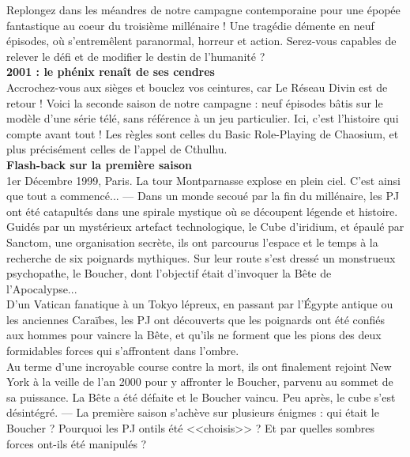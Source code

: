 \documentclass[11pt,twoside,a4paper]{book}
\begin{document}
Replongez dans les m{\'e}andres de notre campagne contemporaine pour une {\'e}pop{\'e}e fantastique au coeur du troisi{\`e}me mill{\'e}naire ! Une trag{\'e}die d{\'e}mente en neuf {\'e}pisodes, o{\`u} s'entrem{\^e}lent paranormal, horreur et action. Serez-vous capables de relever le d{\'e}fi et de modifier le destin de l'humanit{\'e} ? ~\\

\textbf{\LARGE 2001 : le ph{\'e}nix rena{\^i}t de ses cendres} ~\\

Accrochez-vous aux si{\`e}ges et bouclez vos ceintures, car Le R{\'e}seau Divin est de retour ! Voici la seconde saison de notre campagne : neuf {\'e}pisodes b{\^a}tis sur le mod{\`e}le d'une s{\'e}rie t{\'e}l{\'e}, sans r{\'e}f{\'e}rence {\`a} un jeu particulier. Ici, c'est l'histoire qui compte avant tout ! Les r{\`e}gles sont celles du Basic Role-Playing de Chaosium, et plus pr{\'e}cis{\'e}ment celles de l'appel de Cthulhu. ~\\

\textbf{\LARGE Flash-back sur la premi{\`e}re saison} ~\\

1er D{\'e}cembre 1999, Paris. La tour Montparnasse explose en plein ciel. C'est ainsi que tout a commenc{\'e}... --- Dans un monde secou{\'e} par la fin du mill{\'e}naire, les PJ ont {\'e}t{\'e} catapult{\'e}s dans une spirale mystique o{\`u} se d{\'e}coupent l{\'e}gende et histoire. Guid{\'e}s par un myst{\'e}rieux artefact technologique, le Cube d'iridium, et {\'e}paul{\'e} par Sanctom, une organisation secr{\`e}te, ils ont parcourus l'espace et le temps {\`a} la recherche de six poignards mythiques. Sur leur route s'est dress{\'e} un monstrueux psychopathe, le Boucher, dont l'objectif {\'e}tait d'invoquer la B{\^e}te de l'Apocalypse... ~\\

D'un Vatican fanatique {\`a} un Tokyo l{\'e}preux, en passant par l'{\'E}gypte antique ou les anciennes Cara{\"i}bes, les PJ ont d{\'e}couverts que les poignards ont {\'e}t{\'e} confi{\'e}s aux hommes pour vaincre la B{\^e}te, et qu'ils ne forment que les pions des deux formidables forces qui s'affrontent dans l'ombre. ~\\

Au terme d'une incroyable course contre la mort, ils ont finalement rejoint New York {\`a} la veille de l'an 2000 pour y affronter le Boucher, parvenu au sommet de sa puissance. La B{\^e}te a {\'e}t{\'e} d{\'e}faite et le Boucher vaincu. Peu apr{\`e}s, le cube s'est d{\'e}sint{\'e}gr{\'e}. --- La premi{\`e}re saison s'ach{\`e}ve sur plusieurs {\'e}nigmes : qui {\'e}tait le Boucher ? Pourquoi les PJ ontils {\'e}t{\'e} <<choisis>> ? Et par quelles sombres forces ont-ils {\'e}t{\'e} manipul{\'e}s ? ~\\
\end{document}
